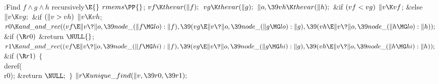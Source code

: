 \B{}:Find $f\land g\land h$ recursively\X${}\E{}$\6
$\\{rmems}\PP{}$;\6
${}\\{vf}\K\\{thevar}(\|f);{}$\6
${}\\{vg}\K\\{thevar}(\|g);{}$\6
${}\|o,\39\\{vh}\K\\{thevar}(\|h);{}$\6
\&{if} ${}(\\{vf}<\\{vg}){}$\1\5
${}\|v\K\\{vf}{}$;\5
\2\&{else}\1\5
${}\|v\K\\{vg};{}$\2\6
\&{if} ${}(\|v>\\{vh}){}$\1\5
${}\|v\K\\{vh}{}$;\2\6
${}\\{r0}\K\\{and\_and\_rec}((\\{vf}\E\|v\?\|o,\39\\{node\_}(\|f\MG\\{lo}):%
\|f),\39(\\{vg}\E\|v\?\|o,\39\\{node\_}(\|g\MG\\{lo}):\|g),\39(\\{vh}\E\|v\?%
\|o,\39\\{node\_}(\|h\MG\\{lo}):\|h));{}$\6
\&{if} ${}(\R\\{r0}){}$\1\5
\&{return} ${}\NULL{}$;\2\6
${}\\{r1}\K\\{and\_and\_rec}((\\{vf}\E\|v\?\|o,\39\\{node\_}(\|f\MG\\{hi}):%
\|f),\39(\\{vg}\E\|v\?\|o,\39\\{node\_}(\|g\MG\\{hi}):\|g),\39(\\{vh}\E\|v\?%
\|o,\39\\{node\_}(\|h\MG\\{hi}):\|h));{}$\6
\&{if} ${}(\R\\{r1}){}$\5
${}\{{}$\1\6
\\{deref}(\\{r0});\6
\&{return} ${}\NULL;{}$\6
\4${}\}{}$\2\6
${}\|r\K\\{unique\_find}(\|v,\39\\{r0},\39\\{r1});{}$\6
